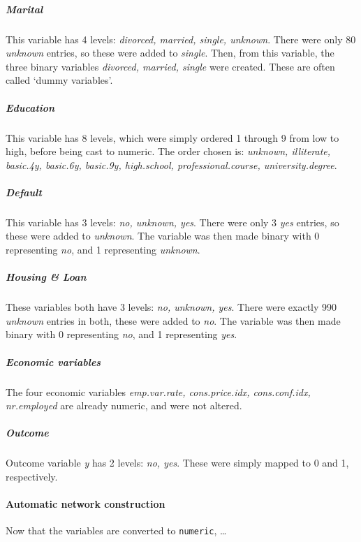 \documentclass[11pt,]{article}
\let\oldparagraph\paragraph
\renewcommand{\paragraph}[1]{\oldparagraph{#1}\mbox{}}
\let\oldsubparagraph\subparagraph
\renewcommand{\subparagraph}[1]{\oldsubparagraph{#1}\mbox{}}
\begin{document}
\begin{multicols}{2}
\hypertarget{marital}{%
\subparagraph{Marital}\label{marital}}

This variable has 4 levels: \emph{divorced, married, single, unknown}.
There were only 80 \emph{unknown} entries, so these were added to
\emph{single}. Then, from this variable, the three binary variables
\emph{divorced, married, single} were created. These are often called
`dummy variables'.

\hypertarget{education}{%
\subparagraph{Education}\label{education}}

This variable has 8 levels, which were simply ordered 1 through 9 from
low to high, before being cast to numeric. The order chosen is:
\emph{unknown, illiterate, basic.4y, basic.6y, basic.9y, high.school,
professional.course, university.degree}.

\hypertarget{default}{%
\subparagraph{Default}\label{default}}

This variable has 3 levels: \emph{no, unknown, yes}. There were only 3
\emph{yes} entries, so these were added to \emph{unknown}. The variable
was then made binary with 0 representing \emph{no}, and 1 representing
\emph{unknown}.

\hypertarget{housing-loan}{%
\subparagraph{Housing \& Loan}\label{housing-loan}}

These variables both have 3 levels: \emph{no, unknown, yes}. There were
exactly 990 \emph{unknown} entries in both, these were added to
\emph{no}. The variable was then made binary with 0 representing
\emph{no}, and 1 representing \emph{yes}.

\hypertarget{economic-variables}{%
\subparagraph{Economic variables}\label{economic-variables}}

The four economic variables \emph{emp.var.rate, cons.price.idx,
cons.conf.idx, nr.employed} are already numeric, and were not altered.

\hypertarget{outcome}{%
\subparagraph{Outcome}\label{outcome}}

Outcome variable \emph{y} has 2 levels: \emph{no, yes}. These were
simply mapped to 0 and 1, respectively.

\hypertarget{automatic-network-construction}{%
\paragraph{Automatic network
construction}\label{automatic-network-construction}}

Now that the variables are converted to \texttt{numeric}, \ldots{}


\end{multicols}
\end{document}
